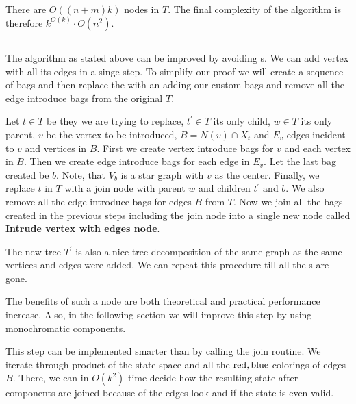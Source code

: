 There are \( O((n+m)k) \) nodes in \( T \).
The final complexity of the algorithm is therefore
\( {k}^{O(k)} \cdot O(n^2) \).

\subsection{\IntroduceVertexWithEdgesNode}


The algorithm as stated above can be improved by avoiding \IntroduceEdgeNode{}s.
We can add vertex with all its edges in a singe step.
To simplify our proof we will create a sequence of bags and then replace the
\IntroduceVertexNode{} with an \JoinNode{} adding our custom bags
and remove all the edge introduce bags from the original \( T \).

Let \( t \in T \) be they \IntroduceVertexNode{} we are trying to replace,
\( t^\prime \in T \) its only child,
\( w \in T \) its only parent,
\( v \) be the vertex to be introduced,
\( B = N(v) \cap X_t \) and
\( E_v \) edges incident to \( v \) and vertices in \( B \).
First we create vertex introduce bags for \( v \) and each vertex in \( B \).
Then we create edge introduce bags for each edge in \( E_v \).
Let the last bag created be \( b \).
Note, that \( V_b \) is a star graph with \( v \) as the center.
Finally, we replace \( t \) in \( T \) with a join node
with parent \( w \) and children \( t^\prime \) and \( b \).
We also remove all the edge introduce bags for edges \( B \) from \( T \).
Now we join all the bags created in the previous steps including the join node
into a single new node called \textbf{Intrude vertex with edges node}.

The new tree \( T^\prime \) is also a nice tree decomposition
of the same graph as the same vertices and edges were added.
We can repeat this procedure till all the \IntroduceEdgeNode{}s are gone.

The benefits of such a node are both theoretical and practical performance increase.
Also, in the following section we will improve this step by using monochromatic components.

This step can be implemented smarter than by calling the join routine.
We iterate through product of the state space and all the \( \text{red}, \text{blue} \)
colorings of edges \( B \). There, we can in \( O(k^2) \) time decide
how the resulting state after components are joined because of the edges look and
if the state is even valid.

